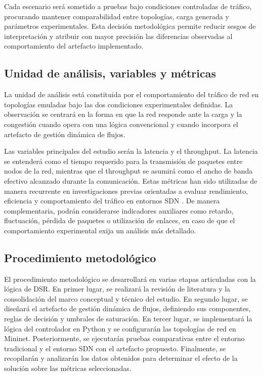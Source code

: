 \documentclass[12pt,a4paper]{article}
\begin{document}
Cada escenario será sometido a pruebas bajo condiciones controladas de tráfico, procurando mantener comparabilidad entre topologías, carga generada y parámetros experimentales. Esta decisión metodológica permite reducir sesgos de interpretación y atribuir con mayor precisión las diferencias observadas al comportamiento del artefacto implementado.

\subsection{Unidad de análisis, variables y métricas}

La unidad de análisis está constituida por el comportamiento del tráfico de red en topologías emuladas bajo las dos condiciones experimentales definidas. La observación se centrará en la forma en que la red responde ante la carga y la congestión cuando opera con una lógica convencional y cuando incorpora el artefacto de gestión dinámica de flujos.

Las variables principales del estudio serán la latencia y el throughput. La latencia se entenderá como el tiempo requerido para la transmisión de paquetes entre nodos de la red, mientras que el throughput se asumirá como el ancho de banda efectivo alcanzado durante la comunicación. Estas métricas han sido utilizadas de manera recurrente en investigaciones previas orientadas a evaluar rendimiento, eficiencia y comportamiento del tráfico en entornos SDN \parencite{moora_sdn, ddqn_sdn, adaptive_lb_sdn}. De manera complementaria, podrán considerarse indicadores auxiliares como retardo, fluctuación, pérdida de paquetes o utilización de enlaces, en caso de que el comportamiento experimental exija un análisis más detallado.

\subsection{Procedimiento metodológico}

El procedimiento metodológico se desarrollará en varias etapas articuladas con la lógica de DSR. En primer lugar, se realizará la revisión de literatura y la consolidación del marco conceptual y técnico del estudio. En segundo lugar, se diseñará el artefacto de gestión dinámica de flujos, definiendo sus componentes, reglas de decisión y umbrales de saturación. En tercer lugar, se implementará la lógica del controlador en Python y se configurarán las topologías de red en Mininet. Posteriormente, se ejecutarán pruebas comparativas entre el entorno tradicional y el entorno SDN con el artefacto propuesto. Finalmente, se recopilarán y analizarán los datos obtenidos para determinar el efecto de la solución sobre las métricas seleccionadas.
\end{document}
